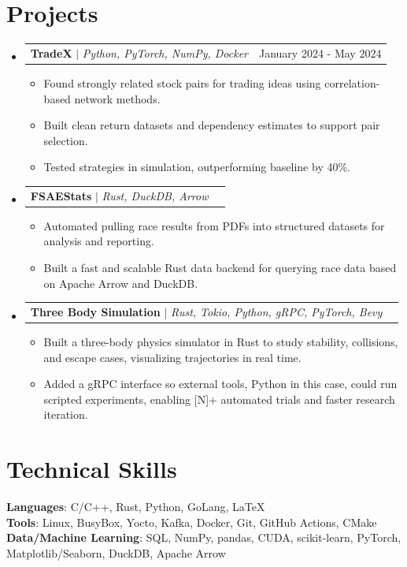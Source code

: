 \documentclass[letterpaper,11pt]{article}
\makeatletter
\newcommand{\resumeItem}[1]{
  \item\small{
    {#1 \vspace{-2pt}}
  }
}
\newcommand{\resumeProjectHeading}[2]{
    \item
    \begin{tabular*}{0.97\textwidth}{l@{\extracolsep{\fill}}r}
      \small#1 & #2 \\
    \end{tabular*}\vspace{-7pt}
}
\newcommand{\resumeSubHeadingListStart}{\begin{itemize}[leftmargin=0.15in, label={}]}
\newcommand{\resumeSubHeadingListEnd}{\end{itemize}}
\newcommand{\resumeItemListStart}{\begin{itemize}}
\newcommand{\resumeItemListEnd}{\end{itemize}\vspace{-5pt}}
\makeatother
\begin{document}
\section{Projects}
    \resumeSubHeadingListStart
      \resumeProjectHeading
      {\textbf{TradeX} $|$ \emph{Python, PyTorch, NumPy, Docker}}{January 2024 - May 2024}
          \resumeItemListStart
          \resumeItem{Found strongly related stock pairs for trading ideas using correlation-based network methods.}
          \resumeItem{Built clean return datasets and dependency estimates to support pair selection.}
          \resumeItem{Tested strategies in simulation, outperforming baseline by 40\%.}
          \resumeItemListEnd
      \resumeProjectHeading
          {\textbf{FSAEStats} $|$ \emph{Rust, DuckDB, Arrow}}{}
          \resumeItemListStart
          \resumeItem{Automated pulling race results from PDFs into structured datasets for analysis and reporting.}
          \resumeItem{Built a fast and scalable Rust data backend for querying race data based on Apache Arrow and DuckDB.}
          \resumeItemListEnd
                \resumeProjectHeading
          {\textbf{Three Body Simulation} $|$ \emph{Rust, Tokio, Python, gRPC, PyTorch, Bevy}}{}
          \resumeItemListStart
          \resumeItem{Built a three-body physics simulator in Rust to study stability, collisions, and escape cases, visualizing trajectories in real time.}
\resumeItem{Added a gRPC interface so external tools, Python in this case, could run scripted experiments, enabling [N]+ automated trials and faster research iteration.}

          \resumeItemListEnd

    \resumeSubHeadingListEnd
%
\section{Technical Skills}
 \begin{itemize}[leftmargin=0.15in, label={}]
    \small{\item{
     \textbf{Languages}{: C/C++, Rust, Python, GoLang, \LaTeX} \\
     \textbf{Tools}{: Linux, BusyBox, Yocto, Kafka, Docker, Git, GitHub Actions, CMake} \\
     \textbf{Data/Machine Learning}{: SQL, NumPy, pandas, CUDA, scikit-learn, PyTorch, Matplotlib/Seaborn, DuckDB, Apache Arrow}
    }}
 \end{itemize}

\end{document}
